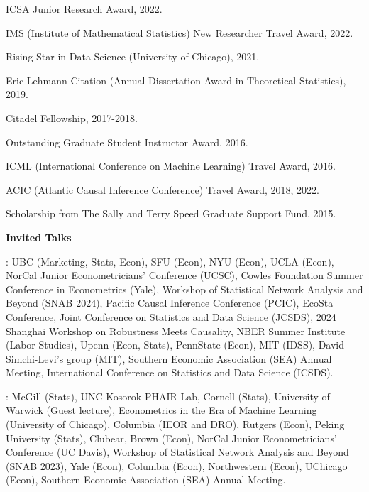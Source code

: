 \documentclass{article}
\begin{document}
ICSA Junior Research Award, 2022.

\vspace{2mm}

IMS (Institute of Mathematical Statistics) New Researcher Travel Award, 2022.

\vspace{2mm}

Rising Star in Data Science (University of Chicago), 2021.

\vspace{2mm}

Eric Lehmann Citation (Annual Dissertation Award in Theoretical Statistics), 2019.

\vspace{2mm}

Citadel Fellowship, 2017-2018.

\vspace{2mm}

Outstanding Graduate Student Instructor Award, 2016.

\vspace{2mm}
ICML (International Conference on Machine Learning) Travel Award, 2016.

\vspace{2mm}
ACIC (Atlantic Causal Inference Conference) Travel Award, 2018, 2022.

\vspace{2mm}
Scholarship from The Sally and Terry Speed Graduate Support Fund, 2015.

\vspace{5mm}

\begin{large}
\noindent \textbf{Invited Talks}
\end{large}

\vspace{4mm}
: UBC (Marketing, Stats, Econ), SFU (Econ), NYU (Econ), UCLA (Econ), NorCal Junior Econometricians' Conference (UCSC), Cowles Foundation Summer Conference in Econometrics (Yale), Workshop of Statistical Network Analysis and Beyond (SNAB 2024), Pacific Causal Inference Conference (PCIC), EcoSta Conference, Joint Conference on Statistics and Data Science (JCSDS), 2024 Shanghai Workshop on Robustness Meets Causality, NBER Summer Institute (Labor Studies), Upenn (Econ, Stats), PennState (Econ), MIT (IDSS), David Simchi-Levi's group (MIT), Southern Economic Association (SEA) Annual Meeting, International Conference on Statistics and Data Science (ICSDS).

\vspace{4mm}
: McGill (Stats), UNC Kosorok PHAIR Lab, Cornell (Stats), University of Warwick (Guest lecture), Econometrics in the Era of Machine Learning (University of Chicago), Columbia (IEOR and DRO), Rutgers (Econ), Peking University (Stats), Clubear, Brown (Econ), NorCal Junior Econometricians' Conference (UC Davis), Workshop of Statistical Network Analysis and Beyond (SNAB 2023), Yale (Econ), Columbia (Econ), Northwestern (Econ), UChicago (Econ), Southern Economic Association (SEA) Annual Meeting.
\end{document}
